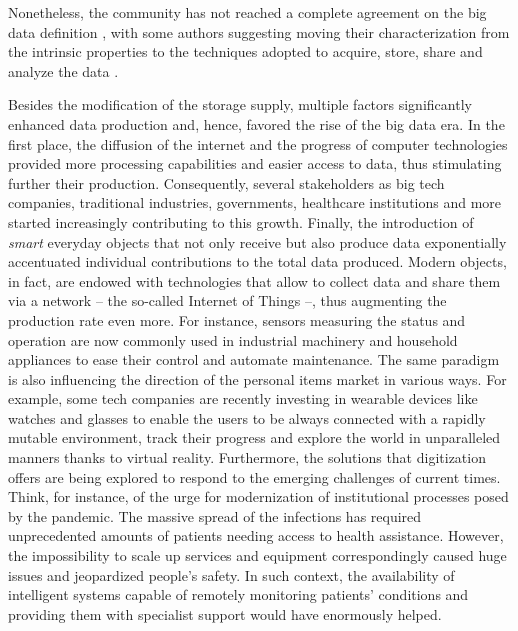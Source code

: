Nonetheless, the community has not reached a complete agreement on the big data definition \cite{22, kitchin2016makes}, with some authors suggesting moving their characterization from the intrinsic properties to the techniques adopted to acquire, store, share and analyze the data \cite{balazka2020big}.


Besides the modification of the storage supply,  multiple factors significantly enhanced data production and, hence, favored the rise of the big data era.
In the first place, the diffusion of the internet and the progress of computer technologies provided more processing capabilities and easier access to data, thus stimulating further their production.
Consequently, several stakeholders as big tech companies, traditional industries, governments, healthcare institutions and more started increasingly contributing to this growth.
Finally, the introduction of \emph{smart} everyday objects that not only receive but also produce data exponentially accentuated individual contributions to the total data produced.
Modern objects, in fact, are endowed with technologies that allow to collect data and share them via a network -- the so-called Internet of Things \cite{ashton2009iot} --, thus augmenting the production rate even more.
For instance, sensors measuring the status and operation are now commonly used in industrial machinery and household appliances to ease their control and automate maintenance.
The same paradigm is also influencing the direction of the personal items market in various ways.
For example, some tech companies are recently investing in wearable devices like watches and glasses to enable the users to be always connected with a rapidly mutable environment, track their progress and explore the world in unparalleled manners thanks to virtual reality.
Furthermore, the solutions that digitization offers are being explored to respond to the emerging challenges of current times.
Think, for instance, of the urge for modernization of institutional processes posed by the pandemic. The massive spread of the infections has required unprecedented amounts of patients needing access to health assistance. However, the impossibility to scale up services and equipment correspondingly caused huge issues and jeopardized people's safety. In such context, the availability of intelligent systems capable of remotely monitoring patients' conditions and providing them with specialist support would have enormously helped.

